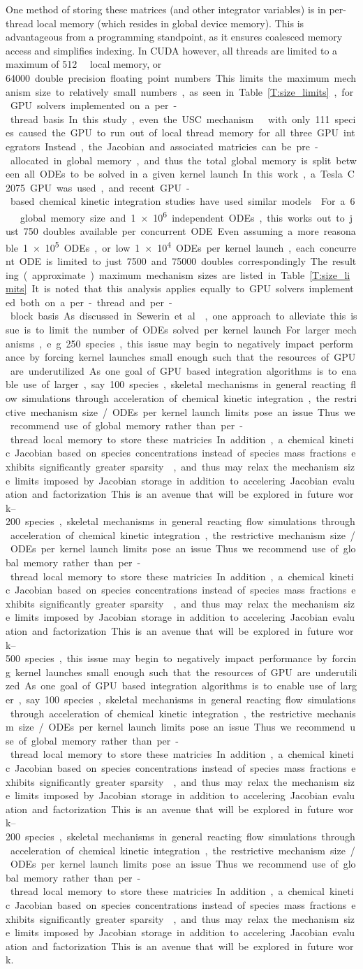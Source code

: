 \documentclass[preprint]{elsarticle}
\begin{document}
One method of storing these matrices (and other integrator variables) is in per-thread local memory (which resides in global device memory).
This is advantageous from a programming standpoint, as it ensures coalesced memory access and simplifies indexing.
In CUDA however, all threads are limited to a maximum of \SI{512}{\kilo\byte} local memory, or \SI{64000} double precision floating point numbers.
This limits the maximum mechanism size to relatively small numbers, as seen in Table~\ref{T:size_limits}, for GPU solvers implemented on a per-thread basis.
In this study, even the USC mechanism ~\cite{Wang:2007} with only 111 species caused the GPU to run out of local thread memory for all three GPU integrators.
Instead, the Jacobian and associated matricies can be pre-allocated in global memory, and thus the total global memory is split between all ODEs to be solved in a given kernel launch.
In this work, a Tesla C2075 GPU was used, and recent GPU-based chemical kinetic integration studies have used similar models~\cite{Shi:2011aa,Niemeyer:2011aa,Shi:2012aa,Le2013596,Stone:2013aa,Niemeyer:2014aa}
For a \SI{6}{\giga\byte} global memory size and \SI{1e6} independent ODEs, this works out to just \SI{750} doubles available per concurrent ODE.
Even assuming a more reasonable \SI{1e5} ODEs, or low \SI{1e4} ODEs per kernel launch, each concurrent ODE is limited to just \SI{7500} and \SI{75000} doubles correspondingly.
The resulting (approximate) maximum mechanism sizes are listed in Table~\ref{T:size_limits}.
It is noted that this analysis applies equally to GPU solvers implemented both on a per-thread and per-block basis.
As discussed in Sewerin et al.~\cite{Sewerin20151375}, one approach to alleviate this issue is to limit the number of ODEs solved per kernel launch. 
For larger mechanisms, e.g. \SIrange{250}{500} species, this issue may begin to negatively impact performance by forcing kernel launches small enough such that the resources of GPU are underutilized.

As one goal of GPU based integration algorithms is to enable use of larger, say \SIrange{100}{200} species, skeletal mechanisms in general reacting flow simulations through acceleration of chemical kinetic integration, the restrictive mechanism size~\slash ODEs per kernel launch limits pose an issue.
Thus we recommend use of global memory rather than per-thread local memory to store these matricies.
In addition, a chemical kinetic Jacobian based on species concentrations instead of species mass fractions exhibits significantly greater sparsity~\cite{Lu:2009gh}, and thus may relax the mechanism size limits imposed by Jacobian storage in addition to accelering Jacobian evaluation and factorization.
This is an avenue that will be explored in future work.
\end{document}
